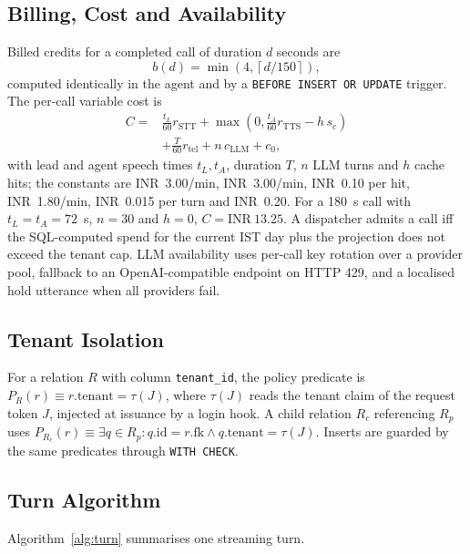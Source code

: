 \documentclass[conference]{IEEEtran}
\begin{document}
\subsection{Billing, Cost and Availability}
Billed credits for a completed call of duration $d$ seconds are
\begin{equation}
b(d)=\min\left(4,\left\lceil d/150\right\rceil\right),
\label{eq:bill}
\end{equation}
computed identically in the agent and by a \texttt{BEFORE INSERT OR UPDATE} trigger. The per-call variable cost is
\begin{equation}
\begin{split}
C={}&\tfrac{t_L}{60}r_{\mathrm{STT}}+\max\left(0,\tfrac{t_A}{60}r_{\mathrm{TTS}}-h\,s_c\right)\\
&+\tfrac{T}{60}r_{\mathrm{tel}}+n\,c_{\mathrm{LLM}}+c_0,
\end{split}
\label{eq:cost}
\end{equation}
with lead and agent speech times $t_L,t_A$, duration $T$, $n$ LLM turns and $h$ cache hits; the constants are INR~3.00/min, INR~3.00/min, INR~0.10 per hit, INR~1.80/min, INR~0.015 per turn and INR~0.20. For a 180~s call with $t_L=t_A=72$~s, $n=30$ and $h=0$, $C=\mathrm{INR}~13.25$. A dispatcher admits a call iff the SQL-computed spend for the current IST day plus the projection does not exceed the tenant cap. LLM availability uses per-call key rotation over a provider pool, fallback to an OpenAI-compatible endpoint on HTTP 429, and a localised hold utterance when all providers fail.

\subsection{Tenant Isolation}
For a relation $R$ with column \texttt{tenant\_id}, the policy predicate is $P_R(r)\equiv r.\mathrm{tenant}=\tau(J)$, where $\tau(J)$ reads the tenant claim of the request token $J$, injected at issuance by a login hook. A child relation $R_c$ referencing $R_p$ uses $P_{R_c}(r)\equiv\exists q\in R_p: q.\mathrm{id}=r.\mathrm{fk}\wedge q.\mathrm{tenant}=\tau(J)$. Inserts are guarded by the same predicates through \texttt{WITH CHECK}.

\subsection{Turn Algorithm}
Algorithm~\ref{alg:turn} summarises one streaming turn.
\end{document}
